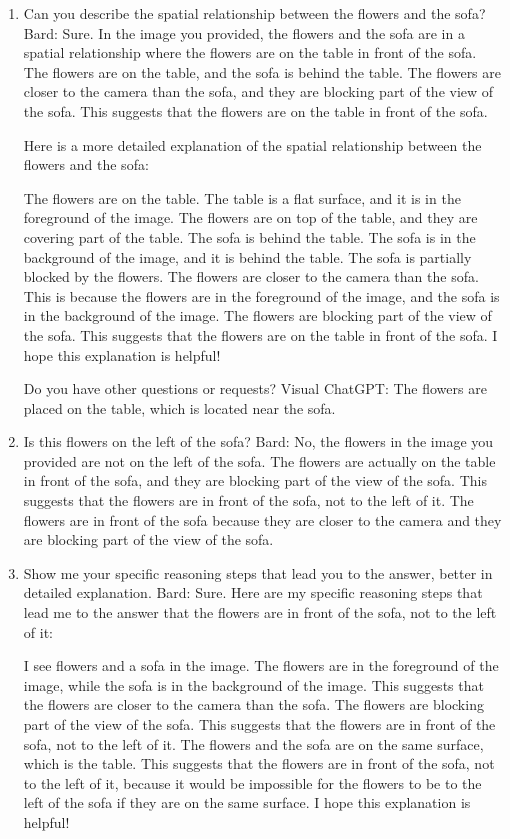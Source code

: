 \begin{enumerate}
    \item Can you describe the spatial relationship between the flowers and the sofa?
    \subitem Bard: 
    Sure. In the image you provided, the flowers and the sofa are in a spatial relationship where the flowers are on the table in front of the sofa. The flowers are on the table, and the sofa is behind the table. The flowers are closer to the camera than the sofa, and they are blocking part of the view of the sofa. This suggests that the flowers are on the table in front of the sofa.
    
    Here is a more detailed explanation of the spatial relationship between the flowers and the sofa:
    
    The flowers are on the table. The table is a flat surface, and it is in the foreground of the image. The flowers are on top of the table, and they are covering part of the table.
    The sofa is behind the table. The sofa is in the background of the image, and it is behind the table. The sofa is partially blocked by the flowers.
    The flowers are closer to the camera than the sofa. This is because the flowers are in the foreground of the image, and the sofa is in the background of the image.
    The flowers are blocking part of the view of the sofa. This suggests that the flowers are on the table in front of the sofa.
    I hope this explanation is helpful!
    
    Do you have other questions or requests?
    \subitem Visual ChatGPT: The flowers are placed on the table, which is located near the sofa.
    \item Is this flowers on the left of the sofa?
    \subitem Bard: 
    No, the flowers in the image you provided are not on the left of the sofa. The flowers are actually on the table in front of the sofa, and they are blocking part of the view of the sofa. This suggests that the flowers are in front of the sofa, not to the left of it. The flowers are in front of the sofa because they are closer to the camera and they are blocking part of the view of the sofa.
    \item Show me your specific reasoning steps that lead you to the answer, better in detailed explanation.
    \subitem Bard: 
    Sure. Here are my specific reasoning steps that lead me to the answer that the flowers are in front of the sofa, not to the left of it:
    
    I see flowers and a sofa in the image.
    The flowers are in the foreground of the image, while the sofa is in the background of the image. This suggests that the flowers are closer to the camera than the sofa.
    The flowers are blocking part of the view of the sofa. This suggests that the flowers are in front of the sofa, not to the left of it.
    The flowers and the sofa are on the same surface, which is the table. This suggests that the flowers are in front of the sofa, not to the left of it, because it would be impossible for the flowers to be to the left of the sofa if they are on the same surface.
    I hope this explanation is helpful!
    

\end{enumerate}
